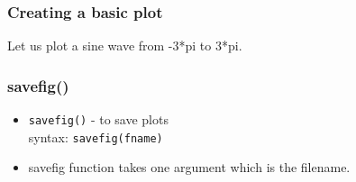 \documentclass[17pt]{beamer}
\begin{document}
\begin{frame}[fragile]
\frametitle{Creating a basic plot}
\label{sec-4}
Let us plot a sine wave from -3*pi to 3*pi.

\end{frame}
\begin{frame}[fragile]
\frametitle{savefig()}
\label{sec-5}
\begin{itemize}
\item \texttt{savefig()} - to save plots\\\pause
syntax: \texttt{savefig(fname)}\pause
\item savefig function takes one argument which is the filename.
\end{itemize} %
\end{frame}
\end{document}
